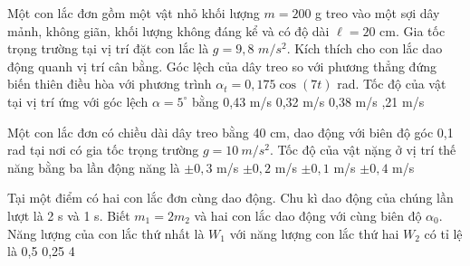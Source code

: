 \begin{vidu}%
Một con lắc đơn gồm một vật nhỏ khối lượng $m = 200$ g treo vào một sợi dây mảnh, không giãn, khối lượng không đáng kể và có độ dài $\ell = 20$ cm. Gia tốc trọng trường tại vị trí đặt con lắc là $g = 9,8$ $m/s^2$. Kích thích cho con lắc dao động quanh vị trí cân bằng. Góc lệch của dây treo so với phương thẳng đứng biến thiên điều hòa với phương trình $\alpha_t = 0,175\cos\left(7t\right)$ rad. Tốc độ của vật tại vị trí ứng với góc lệch $\alpha = 5^\circ$ bằng
\choice 
{0,43 m/s}
{0,32 m/s}
{0,38 m/s}
{,21 m/s}
\end{vidu} %
\begin{vidu}%
Một con lắc đơn có chiều dài dây treo bằng 40 cm, dao động với biên độ góc 0,1 rad tại nơi có gia tốc trọng trường $g = 10\ m/s^2$. Tốc độ của vật nặng ở vị trí thế năng bằng ba lần động năng là
\choice
{$\pm 0,3$ m/s}
{$\pm 0,2$ m/s}
{\True $\pm 0,1$ m/s}
{$\pm 0,4$ m/s}
\end{vidu} %
\begin{vidu}%
Tại một điểm có hai con lắc đơn cùng dao động. Chu kì dao động của chúng lần lượt là 2 s và 1 s. Biết $m_1 = 2m_2$ và hai con lắc dao động với cùng biên độ $\alpha_0$. Năng lượng của con lắc thứ nhất là $W_1$ với năng lượng con lắc thứ hai $W_2$ có tỉ lệ là
\choice
{0,5}
{0,25}
{4}
{}
\end{vidu} %


